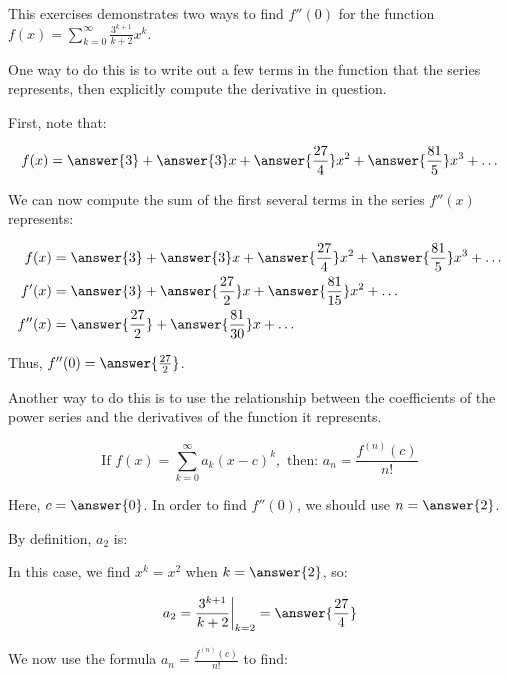 \documentclass{ximera}
\author{Jim Talamo}
\begin{document}
\begin{exercise}
This exercises demonstrates two ways to find $f''(0)$ for the function $f(x) = \sum_{k=0}^{\infty} \frac{3^{k+1}}{k+2}x^k$.  

One way to do this is to write out a few terms in the function that the series represents, then explicitly compute the derivative in question.  

First, note that:

\[
f(x) = \answer{3}+\answer{3}x+\answer{\frac{27}{4}}x^2+\answer{\frac{81}{5}}x^3+\ldots
\]

\begin{exercise}
We can now compute the sum of the first several terms in the series $f''(x)$ represents:

\begin{align*}
f(x) &= \answer{3}+\answer{3}x+\answer{\frac{27}{4}}x^2+\answer{\frac{81}{5}}x^3+\ldots \\
f'(x) &= \answer{3}+\answer{\frac{27}{2}}x+\answer{\frac{81}{15}}x^2+\ldots \\
f''(x) &= \answer{\frac{27}{2}}+\answer{\frac{81}{30}}x+\ldots \\
\end{align*}

Thus, $f''(0) = \answer{\frac{27}{2}}$.
\end{exercise}

\begin{exercise}
Another way to do this is to use the relationship between the coefficients of the power series and the derivatives of the function it represents.

\[
\textrm{If } f(x) = \sum_{k=0}^{\infty} a_k(x-c)^k, \textrm{ then: } a_n = \frac{f^{(n)}(c)}{n!}
\]

Here, $c=\answer{0}$.  In order to find $f''(0)$, we should use $n=\answer{2}$.

By definition, $a_2$ is:

\begin{multipleChoice}
\end{multipleChoice}

In this case, we find $x^k = x^2$ when $k=\answer{2}$, so:

\[
a_2 =  \frac{3^{k+1}}{k+2} \bigg|_{k=2} = \answer{\frac{27}{4}}
\]

\begin{exercise}
We now use the formula $a_n = \frac{f^{(n)}(c)}{n!}$ to find:


\end{exercise}
\end{exercise}
\end{exercise}
\end{document}
